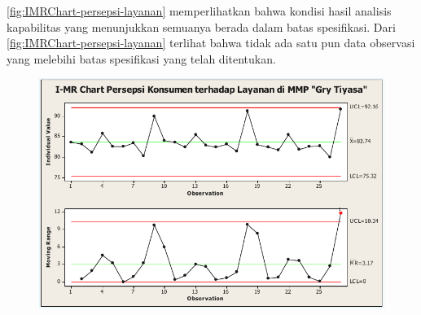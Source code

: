 \autoref{fig:IMRChart-persepsi-layanan} memperlihatkan bahwa kondisi hasil analisis kapabilitas yang menunjukkan semuanya berada dalam batas spesifikasi. Dari \autoref{fig:IMRChart-persepsi-layanan} terlihat bahwa tidak ada satu pun data observasi yang melebihi batas spesifikasi yang telah ditentukan.

\begin{figure}[H]
    \centering
    \includegraphics[width=.7\linewidth]{pdf/I-MR-chart-persepsi-konsumen-terhadap-layanan-di-MMP-Grha-Tiyasa.pdf}
    \label{fig:IMRChart-persepsi-layanan}
\end{figure}